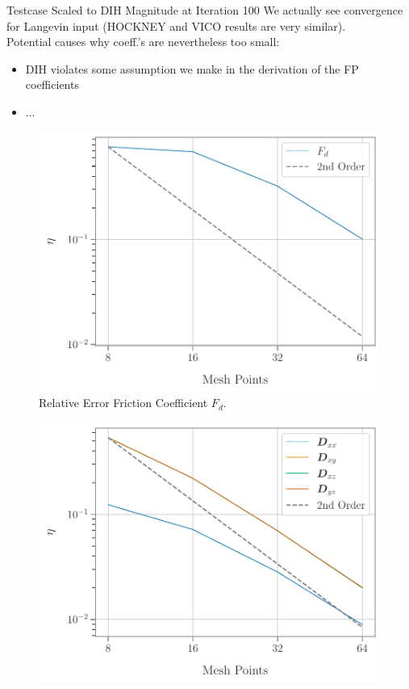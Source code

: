 \begin{frame}[c]{Testcase Scaled to DIH Magnitude at Iteration 100}
    We actually see convergence for Langevin input (HOCKNEY and VICO results are very similar). \\
    Potential causes why coeff.'s are nevertheless too small:
    \begin{itemize}
        \item DIH violates some assumption we make in the derivation of the FP coefficients
        \item ...
    \end{itemize}

    
    \begin{multicols}{2}
    \begin{figure}[!htb]
        \centering
        \captionsetup{justification=centering}
      \includegraphics[width=1.05\linewidth]{figures/Fd_convergence_sigma005vmax.pdf}
      \caption{Relative Error Friction Coefficient $F_d$.}
      \label{fig:rb_potentials_convergence}
    \end{figure}
    \columnbreak
    \begin{figure}[!htb]
        \centering
        \captionsetup{justification=centering}
      \includegraphics[width=1.05\linewidth]{figures/D_005vmax_HOCKNEY.pdf}

\end{figure}
\end{multicols}
\end{frame}
